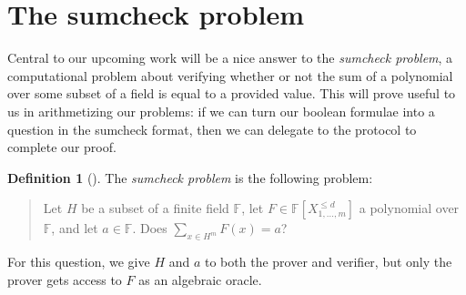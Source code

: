 \documentclass[english,12pt]{reedthesis}
\theoremstyle{plain}
\newtheorem{thm}{Theorem}[section]
\theoremstyle{definition}
\newtheorem{defn}[defn]{Definition}
\theoremstyle{remark}
\DeclarePairedDelimiter{\abs}{\lvert}{\rvert}
\newcommand{\TODO}[1]{\textcolor{red}{TODO: #1}}
\begin{document}





\section{The sumcheck problem}

Central to our upcoming work will be a nice answer to the \emph{sumcheck
  problem}, a computational problem about verifying whether or not the sum of a
polynomial over some subset of a field is equal to a provided value. This will
prove useful to us in arithmetizing our problems: if we can turn our boolean
formulae into a question in the sumcheck format, then we can delegate to the
protocol to complete our proof.

\begin{defn}[{\cite{LFKN92}}]\label{def:sumcheck}
  The \emph{sumcheck problem} is the following problem:
  \begin{quote}
    Let $H$ be a subset of a finite field $\mathbb{F}$, let
    $F \in \mathbb{F}[X_{1, \ldots, m}^{\le d}]$ a polynomial over $\mathbb{F}$, and let
    $a \in \mathbb{F}$. Does $\sum_{x \in H^{m}}F(x) = a$?
  \end{quote}
  For this question, we give $H$ and $a$ to both the prover and verifier, but
  only the prover gets access to $F$ as an algebraic oracle.
\end{defn}
\end{document}
